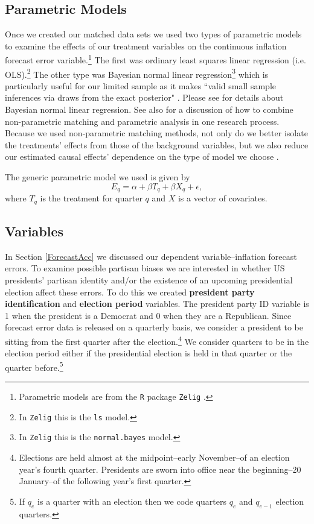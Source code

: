 \documentclass[a4paper]{article}
\begin{document}
\subsection{Parametric Models}

Once we created our matched data sets we used two types of parametric models to examine the effects of our treatment variables on the continuous inflation forecast error variable.\footnote{Parametric models are from the \texttt{R} package \texttt{Zelig} \citep{Zelig2012}.} The first was ordinary least squares linear regression (i.e. OLS).\footnote{In {\tt{Zelig}} this is the {\tt{ls}} model.} The other type was Bayesian normal linear regression\footnote{In {\tt{Zelig}} this is the {\tt{normal.bayes}} model.} which is particularly useful for our limited sample as it makes ``valid small sample inferences via draws from the exact posterior" \citep[][38]{Zelig2012}. Please see \cite{Goodrich2007} for details about Bayesian normal linear regression.  See also \cite{Imai2008} for a discussion of how to combine non-parametric matching and parametric analysis in one research process. Because we used non-parametric matching methods, not only do we better isolate the treatments' effects from those of the background variables, but we also reduce our estimated causal effects' dependence on the type of model we choose \cite[200--201]{Ho2007}.

The generic parametric model we used is given by
%
\begin{equation}
    E_{q} = \alpha + \beta T_{q} + \beta X_{q} + \epsilon,
\end{equation}
%
where $T_{q}$ is the treatment for quarter $q$ and $X$ is a vector of covariates. 

\subsection{Variables}

In Section \ref{ForecastAcc} we discussed our dependent variable--inflation forecast errors. To examine possible partisan biases we are interested in whether US presidents' partisan identity and/or the existence of an upcoming presidential election affect these errors. To do this we created {\bf{president party identification}} and {\bf{election period}} variables. The president party ID variable is 1 when the president is a Democrat and 0 when they are a Republican. Since forecast error data is released on a quarterly basis, we consider a president to be sitting from the first quarter after the election.\footnote{Elections are held almost at the midpoint--early November--of an election year's fourth quarter. Presidents are sworn into office near the beginning--20 January--of the following year's first quarter.} We consider quarters to be in the election period either if the presidential election is held in that quarter or the quarter before.\footnote{If $q_{e}$ is a quarter with an election then we code quarters $q_{e}$ and $q_{e-1}$ election quarters.}
\end{document}
